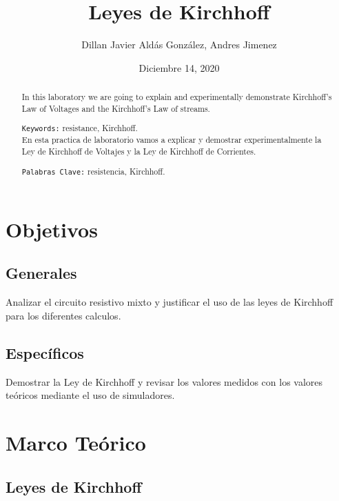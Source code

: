 \documentclass[
 reprint,
 amsmath,amssymb,
 aps,
]{revtex4-2}
\begin{document}

\title{Leyes de Kirchhoff}
\author{Dillan Javier Aldás González, Andres Jimenez}
\date{Diciembre 14, 2020}
\begin{abstract}

In this laboratory we are going to explain and experimentally demonstrate Kirchhoff's Law of Voltages and the Kirchhoff's Law of streams. 

\verb+Keywords:+ resistance, Kirchhoff.\\

En esta practica de laboratorio vamos a explicar y demostrar experimentalmente la Ley de Kirchhoff de Voltajes y la Ley de
Kirchhoff de Corrientes.

\verb+Palabras Clave:+ resistencia, Kirchhoff.

\end{abstract}
\maketitle

\section{Objetivos}

\subsection{Generales}

Analizar el circuito resistivo mixto y justificar el uso de las leyes de Kirchhoff para los diferentes calculos.

\subsection{Específicos}

Demostrar la Ley de Kirchhoff  y revisar los valores medidos con los valores teóricos mediante el uso de simuladores.  

\section{Marco Teórico}

\subsection{Leyes de Kirchhoff}
\end{document}
